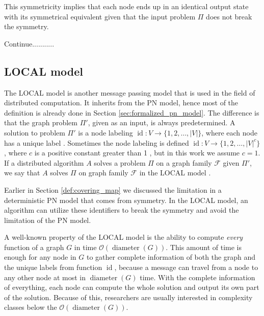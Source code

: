 

This symmetricity implies that each node ends up in an identical output state with its symmetrical equivalent given that the input problem $\Pi$ does not break the symmetry.

Continue...........

\subsection{LOCAL model} \label{sec:local_model}
The LOCAL model is another message passing model that is used in the field of distributed computation.
It inherits from the PN model, hence most of the definition is already done in Section \ref{sec:formalized_pn_model}.
The difference is that the graph problem $\Pi'$, given as an input, is always predetermined.
A solution to problem $\Pi'$ is a node labeling $\operatorname{id}\colon V \rightarrow \{1,2,\dotsc,|V|\}$, where each node has a unique label \cite{DBLP:conf/focs/Linial87}.
Sometimes the node labeling is defined $\operatorname{id}\colon V \rightarrow \{1,2,\dotsc,|V|^c\}$, where $c$ is a positive constant greater than 1 \cite{HirvonenSuomelaDistAlg2020}, but in this work we assume $c=1$.
If a distributed algorithm $A$ solves a problem $\Pi$ on a graph family $\mathcal{F}$ given $\Pi'$, we say that $A$ solves $\Pi$ on graph family $\mathcal{F}$ in the LOCAL model \cite{HirvonenSuomelaDistAlg2020}.

Earlier in Section \ref{def:covering_map} we discussed the limitation in a deterministic PN model that comes from symmetry.
In the LOCAL model, an algorithm can utilize these identifiers to break the symmetry and avoid the limitation of the PN model.

A well-known property of the LOCAL model is the ability to compute \emph{every} function of a graph $G$ in time $\mathcal{O}(\operatorname{diameter}(G))$.
This amount of time is enough for any node in $G$ to gather complete information of both the graph and the unique labels from function $\operatorname{id}$, because a message can travel from a node to any other node at most in $\operatorname{diameter}(G)$ time.
With the complete information of everything, each node can compute the whole solution and output its own part of the solution.
Because of this, researchers are usually interested in complexity classes below the $\mathcal{O}(\operatorname{diameter}(G))$.

